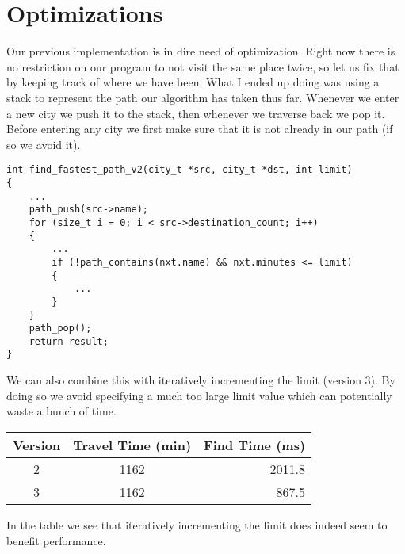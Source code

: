 \documentclass[a4paper, 11pt]{article}
\begin{document}
\section{Optimizations}
	Our previous implementation is in dire need of optimization.
	Right now there is no restriction on our program to not visit the same place twice, so let us fix that by keeping track of where we have been.
	What I ended up doing was using a stack to represent the path our algorithm has taken thus far.
	Whenever we enter a new city we push it to the stack, then whenever we traverse back we pop it.
	Before entering any city we first make sure that it is not already in our path (if so we avoid it).
	\begin{verbatim}
int find_fastest_path_v2(city_t *src, city_t *dst, int limit)
{
	...
	path_push(src->name);
	for (size_t i = 0; i < src->destination_count; i++)
	{
		...
		if (!path_contains(nxt.name) && nxt.minutes <= limit)
		{
			...
		}
	}
	path_pop();
	return result;
}
	\end{verbatim}
	We can also combine this with iteratively incrementing the limit (version 3).
	By doing so we avoid specifying a much too large limit value which can potentially waste a bunch of time.
	\begin{adjustbox}{center}
		\begin{tabular}{|c|c|r|}
			\hline
			\textbf{Version} & \textbf{Travel Time (min)} & \textbf{Find Time (ms)} \\
			\hline
			2 & 1162 & 2011.8 \\
			3 & 1162 &  867.5 \\
			\hline
		\end{tabular}
	\end{adjustbox}

	In the table we see that iteratively incrementing the limit does indeed seem to benefit performance.
\end{document}
